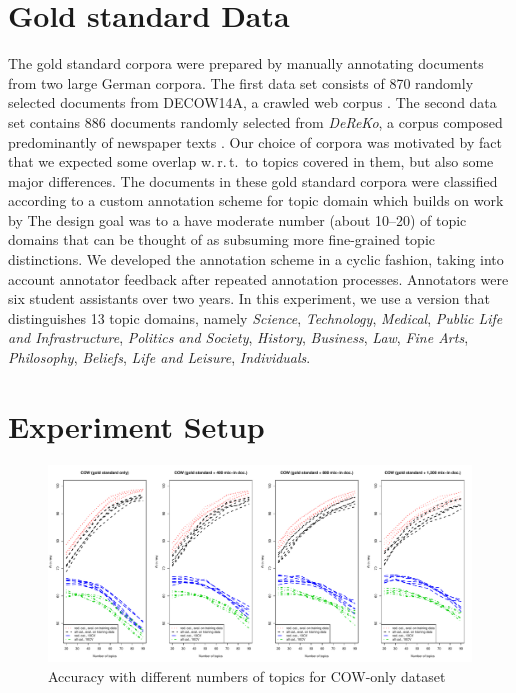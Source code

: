 \documentclass[11pt]{article}
\begin{document}
\section{Gold standard Data}
\label{sec:goldstandard}

The gold standard corpora were prepared by manually annotating documents from two large German corpora.
The first data set consists of 870 randomly selected documents from DECOW14A, a crawled web corpus \cite{SchaeferBildhauer2012a,Schaefer2015b}.
The second data set contains 886 documents randomly selected from \textit{DeReKo}, a corpus composed predominantly of newspaper texts \cite{KupietzEa2010}. 
Our choice of corpora was motivated by fact that we expected some overlap w.\,r.\,t.\ to topics covered in them, but also some major differences. 
The documents in these gold standard corpora were classified according to a custom annotation scheme for topic domain which builds on work by \cite{Sharoff2006}
The design goal was to a have moderate number (about 10--20) of topic domains that can be thought of as subsuming more fine-grained topic distinctions.
We developed the annotation scheme in a cyclic fashion, taking into account annotator feedback after repeated annotation processes.
Annotators were six student assistants over two years.
In this experiment, we use a version that distinguishes 13 topic domains, namely \textit{Science}, \textit{Technology}, \textit{Medical}, \textit{Public Life and Infrastructure}, \textit{Politics and Society}, \textit{History}, \textit{Business}, \textit{Law}, \textit{Fine Arts},  \textit{Philosophy}, \textit{Beliefs},  \textit{Life and Leisure}, \textit{Individuals}.

\section{Experiment Setup}
\label{sec:experiment}

\begin{figure}[h]
  \centering
  \includegraphics[width=\textwidth]{graphics/cow.pdf}
  \caption{Accuracy with different numbers of topics for COW-only dataset}
  \label{fig:cow}
\end{figure}
\end{document}
